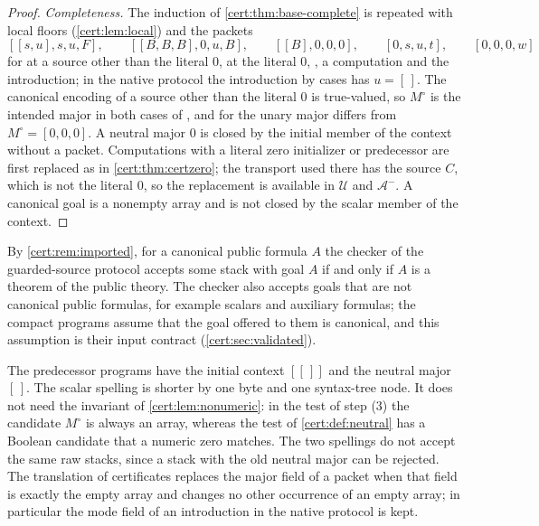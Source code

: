 \begin{proof}
\emph{Completeness.} The induction of \cref{cert:thm:base-complete} is
repeated with local floors (\cref{cert:lem:local}) and the packets
\[
[[s,u],s,u,F],\qquad [[B,B,B],0,u,B],\qquad [[B],0,0,0],\qquad
[0,s,u,t],\qquad [0,0,0,w]
\]
for  at a source other than the literal $0$,  at the
literal $0$, , a computation and the introduction; in the native
protocol the introduction by cases has $u=[\,]$. The canonical encoding of a
source other than the literal $0$ is true-valued, so $M^{\circ}$ is the
intended major in both cases of , and for  the unary
major differs from $M^{\circ}=[0,0,0]$. A neutral major $0$ is closed by the
initial member of the context without a packet. Computations with a literal
zero initializer or predecessor are first replaced as in
\cref{cert:thm:certzero}; the transport used there has the source $C$, which
is not the literal $0$, so the replacement is available in $\mathcal U$ and
$\mathcal A^{-}$. A canonical goal is a nonempty array and is not closed by
the scalar member of the context.
\end{proof}

By \cref{cert:rem:imported}, for a canonical public formula $A$ the checker of
the guarded-source protocol accepts some stack with goal $A$ if and only if
$A$ is a theorem of the public theory. The checker also accepts goals that
are not canonical public formulas, for example scalars and auxiliary formulas;
the compact programs assume that the goal offered to them is canonical, and
this assumption is their input contract (\cref{cert:sec:validated}).

\begin{remark}\label{cert:rem:scalar-vs-empty}
The predecessor programs have the initial context $[[\,]]$ and the neutral
major $[\,]$. The scalar spelling is shorter by one byte and one syntax-tree
node. It does not need the invariant of \cref{cert:lem:nonumeric}: in the
test of step (3) the candidate $M^{\circ}$ is always an array, whereas the
test of \cref{cert:def:neutral} has a Boolean candidate that a numeric zero
matches. The two spellings do not accept the same raw stacks, since a stack
with the old neutral major can be rejected. The translation of certificates
replaces the major field of a packet when that field is exactly the empty
array and changes no other occurrence of an empty array; in particular the
mode field of an introduction in the native protocol is kept.
\end{remark}

